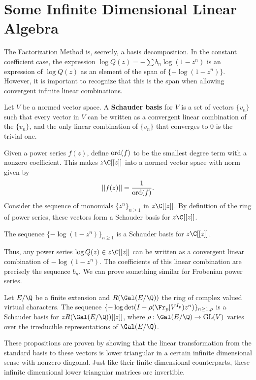 \documentclass[12pt]{amsart}
\theoremstyle{plain}
\begin{document}
\section{Some Infinite Dimensional Linear Algebra}\label{sec:inf_lin_alg}

The Factorization Method is, secretly, a basis decomposition. In the constant coefficient case, the expression $\log Q(z) = -\sum b_n \log(1-z^n)$ is an expression of $\log Q(z)$ as an element of the span of $\{-\log(1-z^n)\}$. However, it is important to recognize that this is the span when allowing convergent infinite linear combinations.

Let $V$ be a normed vector space. A \textbf{Schauder basis} for $V$ is a set of vectors $\{v_n\}$ such that every vector in $V$ can be written as a convergent linear combination of the $\{v_n\}$, and the only linear combination of $\{v_n\}$ that converges to $0$ is the trivial one.

Given a power series $f(z)$, define ${\rm ord}(f)$ to be the smallest degree term with a nonzero coefficient. This makes $z\C[[z]]$ into a normed vector space with norm given by
\[
    ||f(z)|| = \frac{1}{{\rm ord}(f)}.
\]
Consider the sequence of monomials $\{z^n\}_{n\ge 1}$ in $z\C[[z]]$. By definition of the ring of power series, these vectors form a Schauder basis for $z\C[[z]]$.

\begin{proposition}\label{prop:basis_const}
    The sequence $\{-\log(1-z^n)\}_{n\ge 1}$ is a Schauder basis for $z\C[[z]]$.
\end{proposition}

Thus, any power series $\log Q(z) \in z\C[[z]]$ can be written as a convergent linear combination of $-\log(1-z^n)$. The coefficients of this linear combination are precisely the sequence $b_n$. We can prove something similar for Frobenian power series.

\begin{proposition}\label{prop:basis_Frob}
    Let $E/\Q$ be a finite extension and $R(\Gal(E/\Q))$ the ring of complex valued virtual characters. The sequence $\{-\log\det(I - \rho(\Fr_p|V^{I_p})z^n)\}_{n\ge 1,\rho}$ is a Schauder basis for $zR(\Gal(E/\Q))[[z]]$, where $\rho:\Gal(E/\Q)\to {\rm GL}(V)$ varies over the irreducible representations of $\Gal(E/\Q)$.
\end{proposition}

These propositions are proven by showing that the linear transformation from the standard basis to these vectors is lower triangular in a certain infinite dimensional sense with nonzero diagonal. Just like their finite dimensional counterparts, these infinite dimensional lower triangular matrices are invertible.
\end{document}
